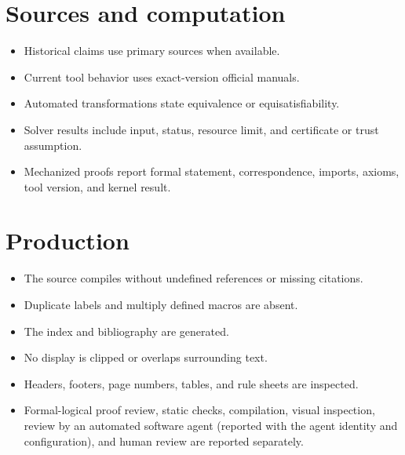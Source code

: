 \section{Sources and computation}
\label{sec:release-checklist-03}
\begin{itemize}
  \item Historical claims use primary sources when available.
  \item Current tool behavior uses exact-version official manuals.
  \item Automated transformations state equivalence or equisatisfiability.
  \item Solver results include input, status, resource limit, and certificate or
        trust assumption.
  \item Mechanized proofs report formal statement, correspondence, imports,
        axioms, tool version, and kernel result.
\end{itemize}

\section{Production}
\label{sec:release-checklist-04}
\begin{itemize}
  \item The source compiles without undefined references or missing citations.
  \item Duplicate labels and multiply defined macros are absent.
  \item The index and bibliography are generated.
  \item No display is clipped or overlaps surrounding text.
  \item Headers, footers, page numbers, tables, and rule sheets are inspected.
  \item Formal-logical proof review, static checks, compilation, visual
        inspection, review by an automated software agent (reported with
        the agent identity and configuration), and human review are
        reported separately.
\end{itemize}
